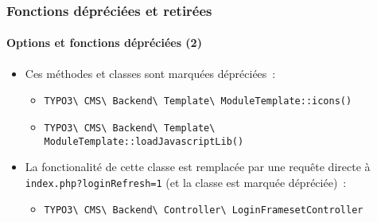 
\begin{frame}[fragile]
	\frametitle{Fonctions dépréciées et retirées}
	\framesubtitle{Options et fonctions dépréciées (2)}

	\begin{itemize}
		\item Ces méthodes et classes sont marquées dépréciées~:

			\begin{itemize}\smaller
				\item \texttt{TYPO3\textbackslash
					CMS\textbackslash
					Backend\textbackslash
					Template\textbackslash
					ModuleTemplate::icons()}

				\item \texttt{TYPO3\textbackslash
					CMS\textbackslash
					Backend\textbackslash
					Template\textbackslash
					ModuleTemplate::loadJavascriptLib()}

			\end{itemize}

		\item La fonctionalité de cette classe est remplacée par une
			requête directe à \texttt{index.php?loginRefresh=1} (et la
			classe est marquée dépréciée)~:

			\begin{itemize}\smaller
				\item \texttt{TYPO3\textbackslash
					CMS\textbackslash
					Backend\textbackslash
					Controller\textbackslash
					LoginFramesetController}
			\end{itemize}\smaller

	\end{itemize}

\end{frame}


